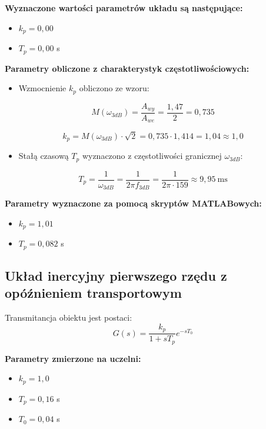 \documentclass[12pt,a4paper]{article}
\begin{document}
	\noindent \textbf{Wyznaczone wartości parametrów układu są następujące:}
	\begin{itemize}
		\item $k_p = 0{,}00$ 
		\item $T_p = 0{,}00$ s
	\end{itemize}
	
	\noindent \textbf{Parametry obliczone z charakterystyk częstotliwościowych:}
	\begin{itemize}
		\item Wzmocnienie $k_p$ obliczono ze wzoru:
	\end{itemize}
	
	\begin{equation}
		M(\omega_{3dB}) = \frac{A_{wy}}{A_{we}} = \frac{1{,}47}{2} = 0{,}735
	\end{equation}
	
	\begin{equation}
		k_p = M(\omega_{3dB}) \cdot \sqrt{2} = 0{,}735 \cdot 1{,}414 = 1{,}04 \approx 1{,}0
	\end{equation}
	
	\begin{itemize}
		\item Stałą czasową $T_p$ wyznaczono z częstotliwości granicznej $\omega_{3dB}$:
	\end{itemize}
	
	\begin{equation}
		T_p = \frac{1}{\omega_{3dB}} = \frac{1}{2\pi f_{3dB}} = \frac{1}{2\pi \cdot 159} \approx 9{,}95\ \text{ms}
	\end{equation}
	
	\noindent \textbf{Parametry wyznaczone za pomocą skryptów MATLABowych:}
	\begin{itemize}
		\item $k_p = 1{,}01$ %
		\item $T_p = 0{,}082$ s %
	\end{itemize}
	
	\subsection{Układ inercyjny pierwszego rzędu z opóźnieniem transportowym}
	Transmitancja obiektu jest postaci:
	\begin{equation}
		G(s) = \frac{k_p}{1 + sT_p} e^{-sT_0}
	\end{equation}
	
	\noindent \textbf{Parametry zmierzone na uczelni:}
	\begin{itemize}
		\item $k_p = 1{,}0$ %
		\item $T_p = 0{,}16$ s %
		\item $T_0 = 0{,}04$ s %
	\end{itemize}
	
\end{document}
